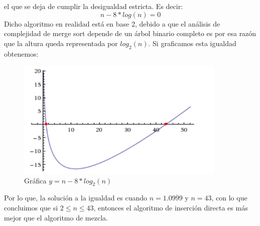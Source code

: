 \documentclass[11 pt, a4paper]{article}
\theoremstyle{definition}
\begin{document}
\begin{enumerate}
\begin{itemize}
      el que se deja de cumplir la desigualdad estricta. Es decir:
      \[ n - 8*log(n) = 0 \]
      Dicho algoritmo en realidad está en base 2, debido a que el análisis
      de complejidad de merge sort depende de un árbol binario completo
      es por esa razón que la altura queda representada por $log_2(n)$.
      Si graficamos esta igualdad obtenemos:
      \begin{figure}[H]
         \centering
          \includegraphics[trim=0cm 0cm 0cm 0cm, width=10cm]{ejercicio2_1.png} 
          \caption{Gráfica $y= n-8*log_2(n)$}
      \end{figure}
      Por lo que, la solución a la igualdad es cuando
      $n =1.0\overline{999}$ y $n=43$, con lo que concluimos que si 
      $2 \leq n \leq 43$, entonces el algoritmo de inserción directa 
      es más mejor que el algoritmo de mezcla.
   


\end{itemize}
\end{enumerate}
\end{document}
